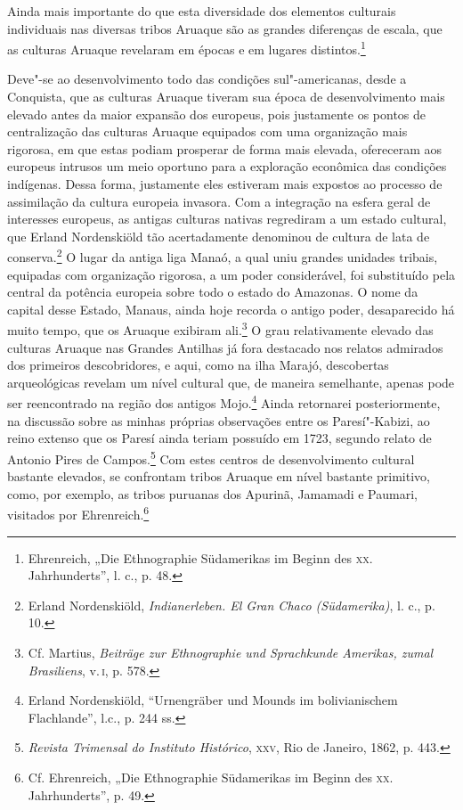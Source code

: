 Ainda mais importante do que esta diversidade dos elementos culturais
individuais nas diversas tribos Aruaque são as grandes diferenças de
escala, que as culturas Aruaque revelaram em épocas e em lugares
distintos.\footnote{Ehrenreich, „Die Ethnographie Südamerikas im Beginn
  des \textsc{xx}. Jahrhunderts'', l. c., p. 48.}

Deve"-se ao desenvolvimento todo das condições sul"-americanas, desde a
Conquista, que as culturas Aruaque tiveram sua época de desenvolvimento
mais elevado antes da maior expansão dos europeus, pois justamente os
pontos de centralização das culturas Aruaque equipados com uma
organização mais rigorosa, em que estas podiam prosperar de forma mais
elevada, ofereceram aos europeus intrusos um meio oportuno para a
exploração econômica das condições indígenas. Dessa forma, justamente
eles estiveram mais expostos ao processo de assimilação da cultura
europeia invasora. Com a integração na esfera geral de interesses
europeus, as antigas culturas nativas regrediram a um estado cultural,
que Erland Nordenskiöld tão acertadamente denominou de cultura de lata
de conserva.\footnote{Erland Nordenskiöld, \emph{Indianerleben. El Gran
  Chaco (Südamerika)}, l. c., p. 10.} O lugar da antiga liga Manaó, a
qual uniu grandes unidades tribais, equipadas com organização rigorosa,
a um poder considerável, foi substituído pela central da potência
europeia sobre todo o estado do Amazonas. O nome da capital desse
Estado, Manaus, ainda hoje recorda o antigo poder, desaparecido há muito
tempo, que os Aruaque exibiram ali.\footnote{Cf. Martius, \emph{Beiträge
  zur Ethnographie und Sprachkunde Amerikas, zumal Brasiliens}, v.\,\textsc{i}, p.
  578.} O grau relativamente elevado das culturas Aruaque nas Grandes
Antilhas já fora destacado nos relatos admirados dos primeiros
descobridores, e aqui, como na ilha Marajó, descobertas arqueológicas
revelam um nível cultural que, de maneira semelhante, apenas pode ser
reencontrado na região dos antigos Mojo.\footnote{Erland Nordenskiöld,
  ``Urnengräber und Mounds im bolivianischem Flachlande'', l.c., p. 244
  ss.} Ainda retornarei posteriormente, na discussão sobre as minhas
próprias observações entre os Paresí"-Kabizi, ao reino extenso que os
Paresí ainda teriam possuído em 1723, segundo relato de Antonio Pires
de Campos.\footnote{\emph{Revista Trimensal do Instituto Histórico}, \textsc{xxv},
  Rio de Janeiro, 1862, p. 443.} Com estes centros de desenvolvimento
cultural bastante elevados, se confrontam tribos Aruaque em nível
bastante primitivo, como, por exemplo, as tribos puruanas dos Apurinã,
Jamamadi e Paumari, visitados por Ehrenreich.\footnote{Cf. Ehrenreich,
  „Die Ethnographie Südamerikas im Beginn des \textsc{xx}. Jahrhunderts'', p.
  49.}

